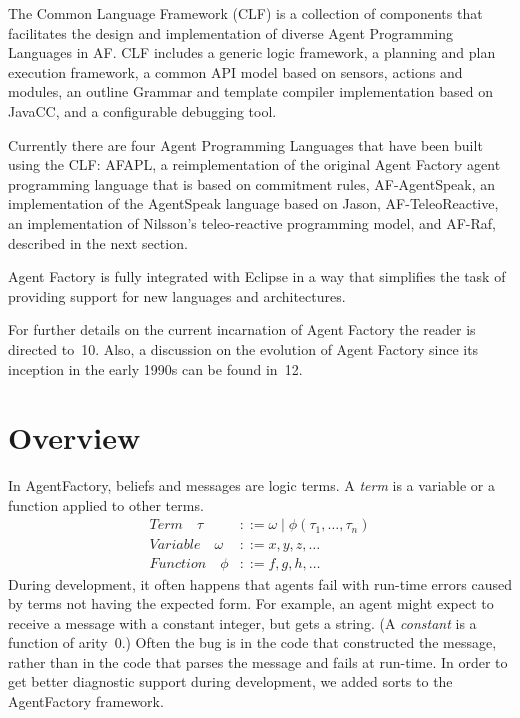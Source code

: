\documentclass[preprint]{sigplanconf} %
\begin{document}
The Common Language Framework (CLF) is a collection of components that
facilitates the design and implementation of diverse Agent Programming
Languages in AF. CLF includes a generic logic framework, a planning and
plan execution framework, a common API model based on sensors, actions and
modules, an outline Grammar and template compiler implementation based on
JavaCC, and a configurable debugging tool.

Currently there are four Agent Programming Languages that have been built
using the CLF: AFAPL, a reimplementation of the original Agent Factory
agent programming language that is based on commitment rules,
AF-AgentSpeak, an implementation of the AgentSpeak language based on
Jason, AF-TeleoReactive, an implementation of Nilsson's teleo-reactive
programming model, and AF-Raf, described in the next section.

Agent Factory is fully integrated with Eclipse in a way that simplifies
the task of providing support for new languages and architectures.

For further details on the current incarnation of Agent Factory the reader
is directed to~\cite{}10. Also, a discussion on the evolution of Agent
Factory since its inception in the early 1990s can be found in~\cite{}12.

\section{Overview} %

In AgentFactory, beliefs and messages are logic terms. A \emph{term} is a
variable or a function applied to other terms.
\begin{align}
\mathit{Term}\quad\tau
  &::= \omega
  \mid \phi(\tau_1,\ldots,\tau_n) \\
\mathit{Variable}\quad\omega
  &::= x, y, z, \ldots \\
\mathit{Function}\quad\phi
  &::= f, g, h, \ldots
\end{align}
During development, it often happens that agents fail with run-time errors
caused by terms not having the expected form. For example, an agent might
expect to receive a message with a constant integer, but gets a string.  (A
\emph{constant} is a function of arity~$0$.) Often the bug is in the code
that constructed the message, rather than in the code that parses the
message and fails at run-time. In order to get better diagnostic support
during development, we added sorts to the AgentFactory framework.
\end{document}

